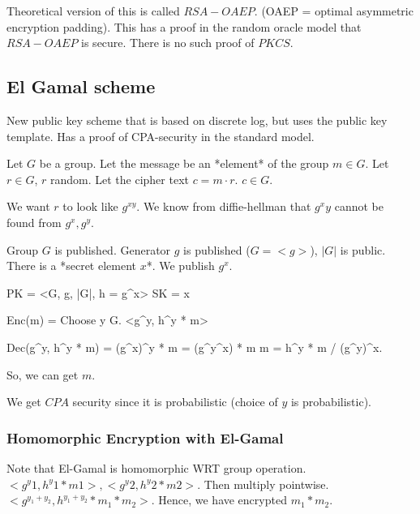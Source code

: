 Theoretical version of this is called $RSA-OAEP$. (OAEP = optimal asymmetric encryption padding).
This has a proof in the random oracle model that $RSA-OAEP$ is secure. There is no such proof of $PKCS$.

\subsection{El Gamal scheme}
New public key scheme that is based on discrete log, but uses the public key template.
Has a proof of CPA-security in the standard model.


Let $G$ be a group. Let the message be an *element* of the group $m \in G$.
Let $r \in G$, $r$ random. Let the cipher text $c = m \cdot r$. $c \in G$.

We want $r$ to look like $g^{xy}$. We know from diffie-hellman that $g^xy$ cannot be found from
$g^x, g^y$.

Group $G$ is published. Generator $g$ is published ($G = <g>$), $|G|$ is public.
There is a *secret element $x$*. We publish $g^x$.

PK = <G, g, |G|, h = g^x>
SK = x

Enc(m) = Choose y \in G. <g^y, h^y * m>

Dec(g^y, h^y * m) = (g^x)^y * m = (g^y^x) * m
m = h^y * m / (g^y)^x.

So, we can get $m$.

We get $CPA$ security since it is probabilistic (choice of $y$ is probabilistic).


\subsubsection{Homomorphic Encryption with El-Gamal}
Note that El-Gamal is homomorphic WRT group operation.
$<g^y1, h^y1 * m1>, <g^y2, h^y2 * m2>$. Then multiply pointwise. $<g^{y_1 + y_2}, h^{y_1 + y_2}*m_1*m_2>$. Hence, we have encrypted $m_1 * m_2$.




